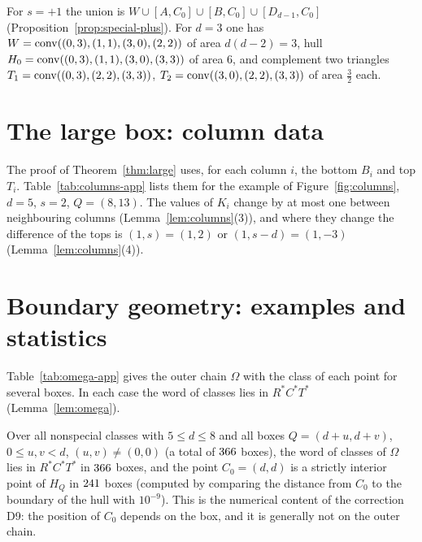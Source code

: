 For $s=+1$ the union is $W\cup[A,C_0]\cup[B,C_0]\cup[D_{d-1},C_0]$ (Proposition~\ref{prop:special-plus}). For $d=3$ one has $W=\operatorname{conv}((0,3),(1,1),(3,0),(2,2))$ of area $d(d-2)=3$, hull $H_0=\operatorname{conv}((0,3),(1,1),(3,0),(3,3))$ of area $6$, and complement two triangles $T_1=\operatorname{conv}((0,3),(2,2),(3,3))$, $T_2=\operatorname{conv}((3,0),(2,2),(3,3))$ of area $\tfrac32$ each.

\section{The large box: column data}\label{app:large}

The proof of Theorem~\ref{thm:large} uses, for each column $i$, the bottom $B_i$ and top $T_i$. Table~\ref{tab:columns-app} lists them for the example of Figure~\ref{fig:columns}, $d=5$, $s=2$, $Q=(8,13)$. The values of $K_i$ change by at most one between neighbouring columns (Lemma~\ref{lem:columns}(3)), and where they change the difference of the tops is $(1,s)=(1,2)$ or $(1,s-d)=(1,-3)$ (Lemma~\ref{lem:columns}(4)).

\begin{table}[ht]
\centering\small

\caption{Column data for $d=5$, $s=2$, $Q=(8,13)$. In column $0$ the bottom is $B_0=(0,d)$ since the origin is deleted.}\label{tab:columns-app}
\end{table}

\section{Boundary geometry: examples and statistics}\label{app:boundary}

Table~\ref{tab:omega-app} gives the outer chain $\Omega$ with the class of each point for several boxes. In each case the word of classes lies in $R^*C^*T^*$ (Lemma~\ref{lem:omega}).

\begin{table}[ht]
\centering\small

\caption{The outer chain $\Omega$ (from $B$ counterclockwise to $A$) with classes as superscripts.}\label{tab:omega-app}
\end{table}

Over all nonspecial classes with $5\le d\le8$ and all boxes $Q=(d+u,d+v)$, $0\le u,v<d$, $(u,v)\ne(0,0)$ (a total of $366$ boxes), the word of classes of $\Omega$ lies in $R^*C^*T^*$ in $366$ boxes, and the point $C_0=(d,d)$ is a strictly interior point of $H_Q$ in $241$ boxes (computed by comparing the distance from $C_0$ to the boundary of the hull with $10^{-9}$). This is the numerical content of the correction D9: the position of $C_0$ depends on the box, and it is generally not on the outer chain.

